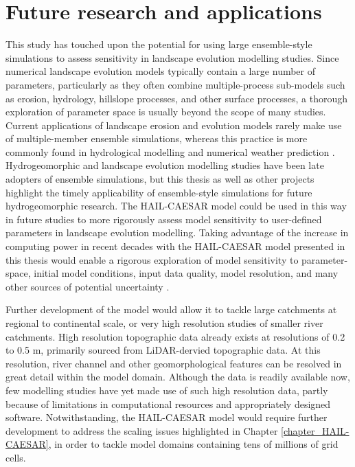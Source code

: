 \section{Future research and applications}
This study has touched upon the potential for using large ensemble-style simulations to assess sensitivity in landscape evolution modelling studies. Since numerical landscape evolution models typically contain a large number of parameters, particularly as they often combine multiple-process sub-models such as erosion, hydrology, hillslope processes, and other surface processes, a thorough exploration of parameter space is usually beyond the scope of many studies. Current applications of landscape erosion and evolution models rarely make use of multiple-member ensemble simulations, whereas this practice is more commonly found in hydrological modelling \citep{cloke2009ensemble,wong2015sensitivity} and numerical weather prediction \citep{sivillo1997ensemble}. Hydrogeomorphic and landscape evolution modelling studies have been late adopters of ensemble simulations, but this thesis as well as other projects \citep[e.g.][]{schaake2007hepex,skinner2017lemsi} highlight the timely applicability of ensemble-style simulations for future hydrogeomorphic research. The HAIL-CAESAR model could be used in this way in future studies to more rigorously assess model sensitivity to user-defined parameters in landscape evolution modelling. Taking advantage of the increase in computing power in recent decades with the HAIL-CAESAR model presented in this thesis would enable a rigorous exploration of model sensitivity to parameter-space, initial model conditions, input data quality, model resolution, and many other sources of potential uncertainty \citep{pelletier2015forecasting}.

Further development of the model would allow it to tackle large catchments at regional to continental scale, or very high resolution studies of smaller river catchments. High resolution topographic data already exists at resolutions of 0.2 to 0.5 m, primarily sourced from LiDAR-dervied topographic data. At this resolution, river channel and other geomorphological features can be resolved in great detail within the model domain. Although the data is readily available now, few modelling studies have yet made use of such high resolution data, partly because of limitations in computational resources and appropriately designed software. Notwithstanding, the HAIL-CAESAR model would require further development to address the scaling issues highlighted in Chapter \ref{chapter_HAIL-CAESAR}, in order to tackle model domains containing tens of millions of grid cells.

